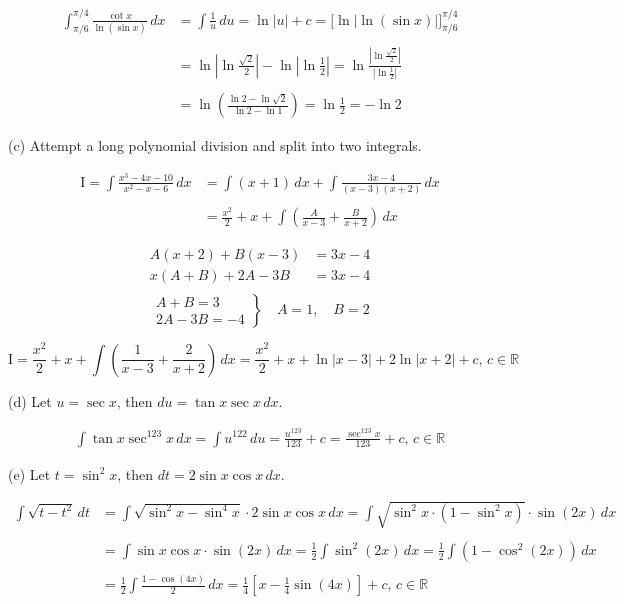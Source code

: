 \documentclass{article}
\begin{document}
\begin{align*}
\int_{\pi/6}^{\pi/4}\frac{\cot x}{\ln(\sin x)}\,dx&=\int\frac1u\,du=\ln|u| + c=\Big[\ln\left|\ln(\sin x)\right| \Big]_{\pi/6}^{\pi/4}\\\\&=\ln\left|\ln\frac{\sqrt2}2\right|-\ln\left|\ln\frac12\right|=\ln\frac{\left|\ln\frac{\sqrt2}{2}\right|}{\left|\ln\frac12\right|}\\\\&=\ln\left(\frac{\ln2-\ln\sqrt2}{\ln2-\ln1}\right)=\ln\frac12=\boxed{-\ln2}
\end{align*}

\hfill

\noindent (c) Attempt a long polynomial division and split into two integrals.

\begin{align*}
\mathrm{I}=\int\frac{x^3-4x-10}{x^2-x-6}\,dx&=\int(x+1)\,dx+\int\frac{3x-4}{(x-3)(x+2)}\,dx\\\\&=\frac{x^2}2+x+\int\left({\frac{A}{x-3}+\frac{B}{x+2}}\right)\,dx
\end{align*}

\begin{align*}
A(x+2)+B(x-3)&=3x-4\\
x(A+B)+2A-3B&=3x-4\\
\end{align*}
\[
\left.
\begin{array}{ll}
A+B=3\\
2A-3B=-4
\end{array}
\right\}
\quad A=1,\quad B=2
\]

\begin{equation*}
\mathrm{I}=\frac{x^2}2+x+\int\left({\frac{1}{x-3}+\frac{2}{x+2}}\right)\,dx=\boxed{\frac{x^2}2+x+\ln|x-3|+2\ln|x+2|+c,\,c\in\mathbb{R}}
\end{equation*}

\hfill

\noindent (d) Let $u=\sec x$, then $du=\tan x \sec x \,dx$.

\begin{align*}\int\tan x\sec^{123}x\,dx=\int u^{122}\,du=\frac{u^{123}}{123}+c = \boxed{\frac{\sec^{123}x}{123}+c,\,c\in\mathbb{R}}\end{align*}

\hfill

\noindent (e) Let $t=\sin^2x$, then $dt=2\sin x\cos x\,dx$.

\begin{align*}\int\sqrt{t-t^2}\,dt&=\int\sqrt{\sin^2x-\sin^4x}\cdot2\sin x \cos x \,dx=\int\sqrt{\sin^2x\cdot(1-\sin^2x)}\cdot\sin(2x)\,dx\\\\&=\int\sin x \cos x\cdot\sin(2x)\,dx=\frac12\int\sin^2(2x)\,dx=\frac12\int\left(1-\cos^2(2x)\right)\,dx\\\\&=\frac12\int\frac{1-\cos(4x)}2\,dx=\frac14\left[x-\frac14\sin(4x)\right]+c,\,c\in\mathbb{R}\end{align*}
\end{document}
